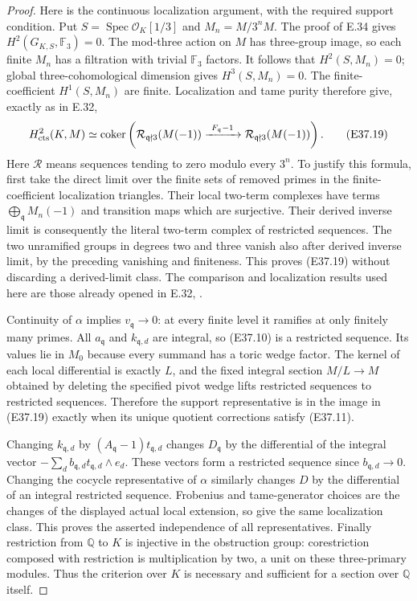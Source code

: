 \begin{proof}
Here is the continuous localization argument, with
the required support condition. Put
$S=\operatorname{Spec}\mathcal O_K[1/3]$ and
$M_n=M/3^nM$. The proof of E.34 gives
$H^2(G_{K,S},\mathbb F_3)=0$. The mod-three action on
$M$ has three-group image, so each finite $M_n$ has
a filtration with trivial $\mathbb F_3$ factors.
It follows that $H^2(S,M_n)=0$; global
three-cohomological dimension gives $H^3(S,M_n)=0$.
The finite-coefficient $H^1(S,M_n)$ are finite.
Localization and tame purity therefore give, exactly
as in E.32,
\[
 H^2_{\rm cts}(K,M)
  \simeq\operatorname{coker}\left(
   \mathcal R_{\mathfrak q\nmid3}(M(-1))
   \xrightarrow{\ F_{\mathfrak q}-1\ }
   \mathcal R_{\mathfrak q\nmid3}(M(-1))\right).
 \tag{E37.19}
\]
Here $\mathcal R$ means sequences tending to zero
modulo every $3^n$. To justify this formula, first
take the direct limit over the finite sets of removed
primes in the finite-coefficient localization triangles.
Their local two-term complexes have terms
$\bigoplus_{\mathfrak q}M_n(-1)$ and transition maps
which are surjective. Their derived inverse limit
is consequently the literal two-term complex of
restricted sequences. The two unramified groups in
degrees two and three vanish also after derived
inverse limit, by the preceding vanishing and
finiteness. This proves (E37.19) without discarding
a derived-limit class. The comparison and localization
results used here are those already opened in E.32,
\cite{E_MilneADT,E_JannsenContinuous}.

Continuity of $\alpha$ implies $v_{\mathfrak q}\to0$:
at every finite level it ramifies at only finitely
many primes. All $a_{\mathfrak q}$ and
$k_{\mathfrak q,d}$ are integral, so (E37.10) is a
restricted sequence. Its values lie in $M_0$ because
every summand has a toric wedge factor.
The kernel of each local differential is exactly $L$,
and the fixed integral section $M/L\to M$ obtained
by deleting the specified pivot wedge lifts restricted
sequences to restricted sequences. Therefore the
support representative is in the image in (E37.19)
exactly when its unique quotient corrections satisfy
(E37.11).

Changing $k_{\mathfrak q,d}$ by
$(A_{\mathfrak q}-1)t_{\mathfrak q,d}$ changes
$D_{\mathfrak q}$ by the differential of the integral
vector $-\sum_db_{\mathfrak q,d}t_{\mathfrak q,d}\wedge e_d$.
These vectors form a restricted sequence since
$b_{\mathfrak q,d}\to0$. Changing the cocycle
representative of $\alpha$ similarly changes $D$ by
the differential of an integral restricted sequence.
Frobenius and tame-generator choices are the changes
of the displayed actual local extension, so give
the same localization class. This proves the asserted
independence of all representatives.
Finally restriction from $\mathbb Q$ to $K$ is injective
in the obstruction group: corestriction composed with
restriction is multiplication by two, a unit on these
three-primary modules. Thus the criterion over $K$
is necessary and sufficient for a section over
$\mathbb Q$ itself.


\end{proof}
